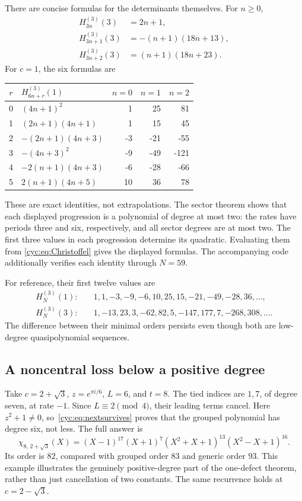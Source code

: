 \documentclass[11pt,a4paper]{article}
\numberwithin{equation}{section}
\theoremstyle{definition}
\theoremstyle{remark}
\newcommand{\cH}[2]{H_{#1}^{(#2)}}
\begin{document}
There are concise formulas for the determinants themselves.  For
$n\ge0$,
\begin{equation}\label{cyc:eq:c3residues}
 \begin{aligned}
 \cH{3n}{3}(3)&=2n+1,\\
 \cH{3n+1}{3}(3)&=-(n+1)(18n+13),\\
 \cH{3n+2}{3}(3)&=(n+1)(18n+23).
 \end{aligned}
\end{equation}
For $c=1$, the six formulas are
\begin{center}
\renewcommand{\arraystretch}{1.12}
\begin{tabular}{@{}clrrr@{}}
\toprule
$r$&$\cH{6n+r}{3}(1)$&$n=0$&$n=1$&$n=2$\\
\midrule
0&$(4n+1)^2$&1&25&81\\
1&$(2n+1)(4n+1)$&1&15&45\\
2&$-(2n+1)(4n+3)$&-3&-21&-55\\
3&$-(4n+3)^2$&-9&-49&-121\\
4&$-2(n+1)(4n+3)$&-6&-28&-66\\
5&$2(n+1)(4n+5)$&10&36&78\\
\bottomrule
\end{tabular}
\end{center}
These are exact identities, not extrapolations.  The sector theorem
shows that each displayed progression is a polynomial of degree at
most two: the rates have periods three and six, respectively, and all
sector degrees are at most two.  The first three values in each
progression determine its quadratic.  Evaluating them from
\eqref{cyc:eq:Christoffel} gives the displayed formulas.  The accompanying
code additionally verifies each identity through $N=59$.

For reference, their first twelve values are
\begin{align*}
 \cH N3(1):&\quad 1,1,-3,-9,-6,10,25,15,-21,-49,-28,36,\ldots,\\
 \cH N3(3):&\quad 1,-13,23,3,-62,82,5,-147,177,7,-268,308,\ldots.
\end{align*}
The difference between their minimal orders persists even though
both are low-degree quasipolynomial sequences.

\subsection{A noncentral loss below a positive degree}
Take $c=2+\sqrt3$, $z=e^{\pi i/6}$, $L=6$, and $t=8$.
The tied indices are $1,7$, of degree seven, at rate $-1$.
Since $L\equiv2\pmod4$, their leading terms cancel.  Here
$z^2+1\ne0$, so~\eqref{cyc:eq:nextsurvives} proves that the grouped
polynomial has degree six, not less.  The full answer is
\begin{equation}\label{cyc:eq:largeexample}
 \chi_{8,\,2+\sqrt3}(X)
 =(X-1)^{17}(X+1)^7
   (X^2+X+1)^{13}(X^2-X+1)^{16}.
\end{equation}
Its order is $82$, compared with grouped order $83$ and generic
order $93$.  This example illustrates the genuinely positive-degree
part of the one-defect theorem, rather than just cancellation of
two constants.  The same recurrence holds at $c=2-\sqrt3$.
\end{document}
